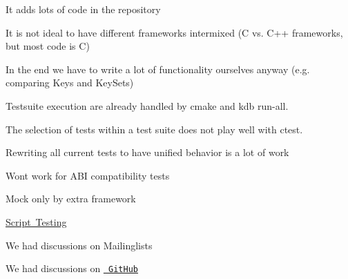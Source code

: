 \begin{DoxyItemize}
\item It adds lots of code in the repository
\item It is not ideal to have different frameworks intermixed (C vs. C++ frameworks, but most code is C)
\item In the end we have to write a lot of functionality ourselves anyway (e.\+g. comparing Keys and Key\+Sets)
\item Testsuite execution are already handled by cmake and kdb run-\/all.
\item The selection of tests within a test suite does not play well with ctest.
\item Rewriting all current tests to have unified behavior is a lot of work
\item Wont work for A\+BI compatibility tests
\item Mock only by extra framework
\end{DoxyItemize}


\begin{DoxyItemize}
\item \mbox{\hyperlink{doc_decisions_script_testing_md}{Script Testing}}
\end{DoxyItemize}


\begin{DoxyItemize}
\item We had discussions on Mailinglists
\item We had discussions on \href{https://github.com/ElektraInitiative/libelektra/pull/26}{\texttt{ Git\+Hub}} 
\end{DoxyItemize}